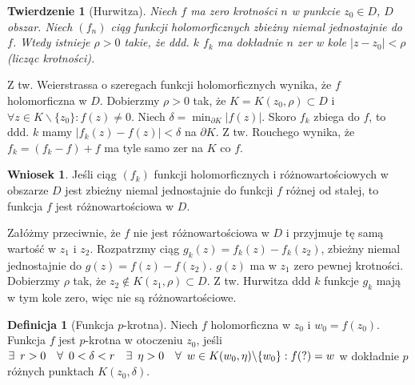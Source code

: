 \documentclass[11pt]{article}
\newcommand{\abs}[1]{\left|#1\right|} %
\newcommand{\Forall}[1]{\mathop{\vcenter{\hbox{\LARGE$\forall$}}}\limits_{#1}} %
\theoremstyle{plain}
\newtheorem*{theorem}{Twierdzenie}
\theoremstyle{definition}
\newtheorem*{definition}{Definicja}
\newtheorem*{corollary}{Wniosek}
\theoremstyle{remark}
\let\oldendproof\endproof
\renewenvironment{proof}[1][\proofname]{
  \oldproof[\textsc{\small #1}]
}{\oldendproof}
\begin{document}

\begin{theorem}[Hurwitza]
  Niech $f$ ma zero krotności $n$ w punkcie $ z_0 \in D $, $D$ obszar.
  Niech $ (f_n) $ ciąg funkcji holomorficznych zbieżny niemal jednostajnie do $f$.
  Wtedy istnieje $ \rho > 0 $ takie, że ddd. $ k $ $ f_k $ ma dokładnie $n$ zer w kole $ \abs{z - z_0} < \rho $ (licząc krotności).
\end{theorem}

\begin{proof}
  Z tw. Weierstrassa o szeregach funkcji holomorficznych wynika, że $f$ holomorficzna w $D$.
  Dobierzmy $ \rho > 0 $ tak, że $ K = K(z_0, \rho) \subset D $ i $ \forall z \in K\backslash\{ z_0 \}: f(z) \neq 0 $.
  Niech $ \delta = \min_{\partial K} \abs{f(z)}$.
  Skoro $ f_k $ zbiega do $ f $, to ddd. $k$ mamy $ \abs{f_k(z) - f(z)} < \delta $ na $ \partial K $.
  Z tw. Rouchego wynika, że $ f_k = (f_k - f) + f $ ma tyle samo zer na $K$ co $ f $.
\end{proof}

\begin{corollary}
  Jeśli ciąg $(f_k)$ funkcji holomorficznych i różnowartościowych w obszarze $D$ jest zbieżny niemal jednostajnie do funkcji $f$ różnej od stałej,
  to funkcja $f$ jest różnowartościowa w $D$.
\end{corollary}

\begin{proof}
  Załóżmy przeciwnie, że $f$ nie jest różnowartościowa w $D$ i przyjmuje tę samą wartość w $z_1$ i $z_2$.
  Rozpatrzmy ciąg $ g_k(z) = f_k(z) - f_k(z_2) $, zbieżny niemal jednostajnie do $ g(z) = f(z) - f(z_2) $.
  $ g(z) $ ma w $ z_1 $ zero pewnej krotności.
  Dobierzmy $ \rho $ tak, że $ z_2 \notin K(z_1, \rho) \subset D $.
  Z tw. Hurwitza ddd $k$ funkcje $g_k$ mają w tym kole zero, więc nie są różnowartościowe.
\end{proof}

\begin{definition}[Funkcja $p$-krotna]
  Niech $f$ holomorficzna w $z_0$ i $w_0=f(z_0)$.
  Funkcja $f$ jest $p$-krotna w otoczeniu $z_0$, jeśli
  $ \exists\enskip r > 0 \quad\forall\enskip 0 < \delta < r \quad\exists\enskip \eta > 0 \quad\forall\enskip w \in K(w_0, \eta)\backslash\{w_0\}: f(?) = w $
  w dokładnie $p$ różnych punktach $ K(z_0, \delta) $.
\end{definition}
\end{document}
